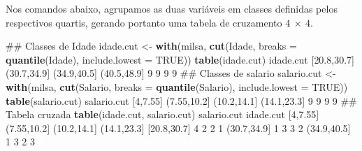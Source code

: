 \documentclass[10pt,a4paper]{book}
\newenvironment{Shaded}{\begin{snugshade}}{\end{snugshade}}
\newcommand{\KeywordTok}[1]{\textcolor[rgb]{0.13,0.29,0.53}{\textbf{#1}}}
\newcommand{\DataTypeTok}[1]{\textcolor[rgb]{0.13,0.29,0.53}{#1}}
\newcommand{\DecValTok}[1]{\textcolor[rgb]{0.00,0.00,0.81}{#1}}
\newcommand{\FloatTok}[1]{\textcolor[rgb]{0.00,0.00,0.81}{#1}}
\newcommand{\StringTok}[1]{\textcolor[rgb]{0.31,0.60,0.02}{#1}}
\newcommand{\OtherTok}[1]{\textcolor[rgb]{0.56,0.35,0.01}{#1}}
\newcommand{\NormalTok}[1]{#1}
\begin{document}
Nos comandos abaixo, agrupamos as duas variáveis em classes definidas
pelos respectivos quartis, gerando portanto uma tabela de cruzamento
\(4~\times~4\).

\begin{Shaded}
\begin{Highlighting}[]
\NormalTok{## Classes de Idade}
\NormalTok{idade.cut <-}\StringTok{ }\KeywordTok{with}\NormalTok{(milsa, }\KeywordTok{cut}\NormalTok{(Idade, }\DataTypeTok{breaks =} \KeywordTok{quantile}\NormalTok{(Idade),}
                             \DataTypeTok{include.lowest =} \OtherTok{TRUE}\NormalTok{))}
\KeywordTok{table}\NormalTok{(idade.cut)}
\NormalTok{idade.cut}
\NormalTok{[}\FloatTok{20.8}\NormalTok{,}\FloatTok{30.7}\NormalTok{] (}\FloatTok{30.7}\NormalTok{,}\FloatTok{34.9}\NormalTok{] (}\FloatTok{34.9}\NormalTok{,}\FloatTok{40.5}\NormalTok{] (}\FloatTok{40.5}\NormalTok{,}\FloatTok{48.9}\NormalTok{] }
          \DecValTok{9}           \DecValTok{9}           \DecValTok{9}           \DecValTok{9} 
\NormalTok{## Classes de salario}
\NormalTok{salario.cut <-}\StringTok{ }\KeywordTok{with}\NormalTok{(milsa, }\KeywordTok{cut}\NormalTok{(Salario, }\DataTypeTok{breaks =} \KeywordTok{quantile}\NormalTok{(Salario),}
                               \DataTypeTok{include.lowest =} \OtherTok{TRUE}\NormalTok{))}
\KeywordTok{table}\NormalTok{(salario.cut)}
\NormalTok{salario.cut}
\NormalTok{   [}\DecValTok{4}\NormalTok{,}\FloatTok{7.55}\NormalTok{] (}\FloatTok{7.55}\NormalTok{,}\FloatTok{10.2}\NormalTok{] (}\FloatTok{10.2}\NormalTok{,}\FloatTok{14.1}\NormalTok{] (}\FloatTok{14.1}\NormalTok{,}\FloatTok{23.3}\NormalTok{] }
          \DecValTok{9}           \DecValTok{9}           \DecValTok{9}           \DecValTok{9} 
\NormalTok{## Tabela cruzada}
\KeywordTok{table}\NormalTok{(idade.cut, salario.cut)}
\NormalTok{             salario.cut}
\NormalTok{idade.cut     [}\DecValTok{4}\NormalTok{,}\FloatTok{7.55}\NormalTok{] (}\FloatTok{7.55}\NormalTok{,}\FloatTok{10.2}\NormalTok{] (}\FloatTok{10.2}\NormalTok{,}\FloatTok{14.1}\NormalTok{] (}\FloatTok{14.1}\NormalTok{,}\FloatTok{23.3}\NormalTok{]}
\NormalTok{  [}\FloatTok{20.8}\NormalTok{,}\FloatTok{30.7}\NormalTok{]        }\DecValTok{4}           \DecValTok{2}           \DecValTok{2}           \DecValTok{1}
\NormalTok{  (}\FloatTok{30.7}\NormalTok{,}\FloatTok{34.9}\NormalTok{]        }\DecValTok{1}           \DecValTok{3}           \DecValTok{3}           \DecValTok{2}
\NormalTok{  (}\FloatTok{34.9}\NormalTok{,}\FloatTok{40.5}\NormalTok{]        }\DecValTok{1}           \DecValTok{3}           \DecValTok{2}           \DecValTok{3}

\end{Highlighting}
\end{Shaded}
\end{document}
